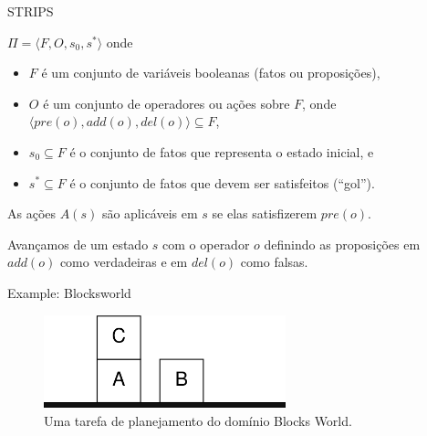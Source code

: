 \documentclass{beamer}
\begin{document}
\begin{frame}{STRIPS}
  \begin{definition}
    $\Pi = \langle F, O, s_{0}, s^{*}\rangle$ onde
    \begin{itemize}
        \item $F$ é um conjunto de variáveis booleanas (\alert{fatos} ou \alert{proposições}),
        \item $O$ é um conjunto de \alert{operadores} ou ações sobre $F$, onde $\langle pre(o), add(o), del(o) \rangle \subseteq F$,
        \item $s_{0} \subseteq F$ é o conjunto de fatos que representa o \alert{estado inicial}, e
        \item $s^{*} \subseteq F$ é o conjunto de fatos que devem ser satisfeitos (``\alert{gol}'').
    \end{itemize}
   \pause
    As ações $A(s)$ são \alert{aplicáveis} em $s$ se elas satisfizerem $pre(o)$.

    Avançamos de um estado $s$ com o operador $o$ definindo as proposições em $add(o)$ como \alert{verdadeiras} e em $del(o)$ como \alert{falsas}.
\end{definition}
\end{frame}

\begin{frame}{Example: Blocksworld} 
\begin{figure}
    \centering
    \includegraphics[width=7cm]{img/blocksworld1.png}
    \caption{Uma tarefa de planejamento do domínio Blocks World.}
\end{figure}
\end{frame}
\end{document}

